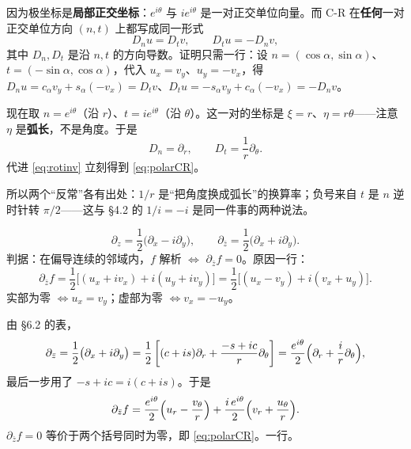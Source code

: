 \documentclass[11pt]{ctexart}
\let\origsubhdr\subhdr
\renewcommand{\subhdr}[1]{\par\needspace{4\baselineskip}\origsubhdr{#1}}
\begin{document}
因为极坐标是\textbf{局部正交坐标}：$e^{i\theta}$ 与 $ie^{i\theta}$ 是一对正交单位向量。而 C-R 在\textbf{任何}一对正交单位方向 $(n,t)$ 上都写成同一形式
\begin{equation}\label{eq:rotinv}
D_n u=D_t v,\qquad D_t u=-D_n v ,
\end{equation}
其中 $D_n,D_t$ 是沿 $n,t$ 的方向导数。证明只需一行：设 $n=(\cos\alpha,\sin\alpha)$、$t=(-\sin\alpha,\cos\alpha)$，代入 $u_x=v_y$、$u_y=-v_x$，得 $D_nu=c_\alpha v_y+s_\alpha(-v_x)=D_tv$、$D_tu=-s_\alpha v_y+c_\alpha(-v_x)=-D_nv$。

现在取 $n=e^{i\theta}$（沿 $r$）、$t=ie^{i\theta}$（沿 $\theta$）。这一对的坐标是 $\xi=r$、$\eta=r\theta$——注意 $\eta$ 是\textbf{弧长}，不是角度。于是
\begin{equation}\label{eq:frame}
D_n=\partial_r,\qquad D_t=\frac1r\partial_\theta .
\end{equation}
代进 \eqref{eq:rotinv} 立刻得到 \eqref{eq:polarCR}。

所以两个“反常”各有出处：$1/r$ 是“把角度换成弧长”的换算率；负号来自 $t$ 是 $n$ 逆时针转 $\pi/2$——这与 §4.2 的 $1/i=-i$ 是同一件事的两种说法。



\begin{equation}\label{eq:wirtinger}
\partial_z=\frac12\bigl(\partial_x-i\partial_y\bigr),\qquad
\partial_{\bar z}=\frac12\bigl(\partial_x+i\partial_y\bigr).
\end{equation}
判据：在偏导连续的邻域内，$f$ 解析 $\iff$ $\partial_{\bar z}f=0$。原因一行：
\[ \partial_{\bar z}f=\frac12\bigl[(u_x+iv_x)+i(u_y+iv_y)\bigr]=\frac12\bigl[(u_x-v_y)+i(v_x+u_y)\bigr]. \]
实部为零 $\iff u_x=v_y$；虚部为零 $\iff v_x=-u_y$。



由 §6.2 的表，
\begin{equation}\label{eq:dzbar}
\partial_{\bar z}=\frac12\bigl(\partial_x+i\partial_y\bigr)
=\frac12\left[(c+is)\partial_r+\frac{-s+ic}{r}\partial_\theta\right]
=\frac{e^{i\theta}}{2}\Bigl(\partial_r+\frac{i}{r}\partial_\theta\Bigr),
\end{equation}
最后一步用了 $-s+ic=i(c+is)$。于是
\[ \partial_{\bar z}f=\frac{e^{i\theta}}{2}\Bigl(u_r-\frac{v_\theta}{r}\Bigr)+\frac{i\,e^{i\theta}}{2}\Bigl(v_r+\frac{u_\theta}{r}\Bigr). \]
$\partial_{\bar z}f=0$ 等价于两个括号同时为零，即 \eqref{eq:polarCR}。一行。
\end{document}
